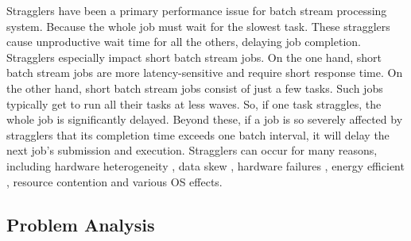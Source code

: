   Stragglers have been a primary performance issue for batch stream processing system. Because the whole job must wait for the slowest task. These stragglers cause unproductive wait time for all the others, delaying job completion. Stragglers especially impact short batch stream jobs. On the one hand, short batch stream jobs are more latency-sensitive and require short response time. On the other hand, short batch stream jobs consist of just a few tasks. Such jobs typically get to run all their tasks at less waves. So, if one task straggles, the whole job is significantly delayed. Beyond these, if a job is so severely affected by stragglers that its completion time exceeds one batch interval, it will delay the next job's submission and execution. Stragglers can occur for many reasons, including hardware heterogeneity \cite{Reiss2012}, data skew \cite{Kwon2012}, hardware failures \cite{Ananthanarayanan2010}, energy efficient \cite{Cheng2015}, resource contention and various OS effects.

\subsection{Problem Analysis}

